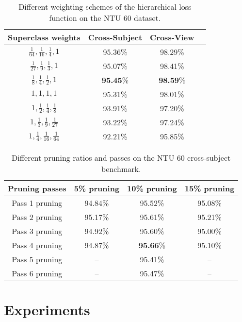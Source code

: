 \documentclass{article}
\begin{document}
\begin{table}[tbh]
\begin{center}
\caption{Different weighting schemes of the hierarchical loss function on the NTU 60 dataset.}
\label{tbl:loss_weigths_comparison}
\begin{tabular}{|c|c|c|c|}
\hline
Superclass weights & Cross-Subject & Cross-View\\ \hline
$\frac{1}{64}, \frac{1}{16}, \frac{1}{4}, 1$  & 95.36\% & 98.29\%\\ $\frac{1}{27}, \frac{1}{9}, \frac{1}{3}, 1$  & 95.07\% & 98.41\% \\ $\frac{1}{8}, \frac{1}{4}, \frac{1}{2}, 1$  & \textbf{95.45}\% & \textbf{98.59}\% \\ $1, 1, 1, 1$  & 95.31\% & 98.01\% \\ $1, \frac{1}{2},\frac{1}{4},\frac{1}{8}$ & 93.91\%  & 97.20\% \\ $1, \frac{1}{3},\frac{1}{9},\frac{1}{27}$ & 93.22\%  & 97.24\% \\ $1, \frac{1}{4}, \frac{1}{16}, \frac{1}{64}$  & 92.21\% & 95.85\%\\ 

\hline

\end{tabular}
\end{center}
\end{table}

\begin{table}
\begin{center}
\caption{Different pruning ratios and passes on the NTU 60 cross-subject benchmark.}
\label{tbl:pruning_comparison}
\begin{tabular}{|c|c|c|c|}
\hline
Pruning passes & 5\% pruning &  10\% pruning &  15\% pruning \\
\hline
Pass 1 pruning & 94.84\% & 95.52\% & 95.08\% \\
Pass 2 pruning & 95.17\% & 95.61\% & 95.21\% \\
Pass 3 pruning & 94.92\% & 95.60\% & 95.00\% \\
Pass 4 pruning & 94.87\% & \textbf{95.66}\% &95.10\% \\
Pass 5 pruning & -- & 95.41\% & -- \\
Pass 6 pruning & -- & 95.47\% & -- \\
\hline

\end{tabular}
\end{center}
\end{table}
 \section{Experiments}
\label{sec:experiments}
\end{document}

